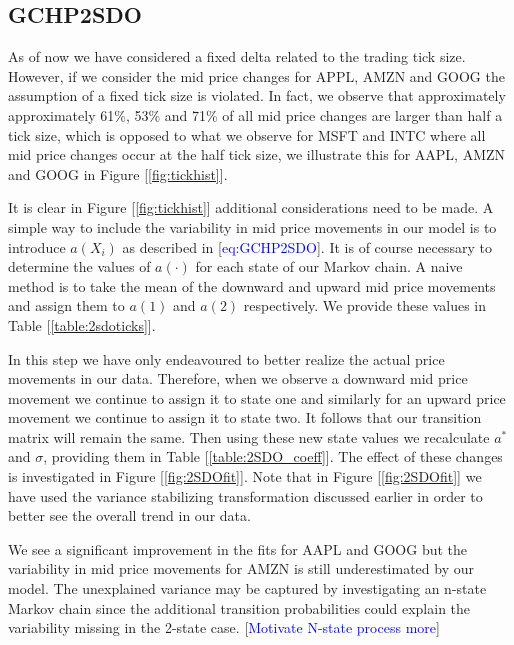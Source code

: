 \documentclass{article}
\begin{document}
\subsection*{GCHP2SDO}

As of now we have considered a fixed delta related to the trading tick size. However, if we consider the mid price changes for APPL, AMZN and GOOG the assumption of a fixed tick size is violated. In fact, we observe that approximately approximately 61\%, 53\% and 71\% of all mid price changes are larger than half a tick size, which is opposed to what we observe for MSFT and INTC where all mid price changes occur at the half tick size, we illustrate this for AAPL, AMZN and GOOG in Figure [\ref{fig:tickhist}].

It is clear in Figure [\ref{fig:tickhist}] additional considerations need to be made. A simple way to include the variability in mid price movements in our model is to introduce $a(X_i)$ as described in [\textcolor{blue}{eq:GCHP2SDO}]. It is of course necessary to determine the values of $a( \cdot )$ for each state of our Markov chain. A naive method is to take the mean of the downward and upward mid price movements and assign them to $a(1)$ and $a(2)$ respectively. We provide these values in Table [\ref{table:2sdoticks}].



In this step we have only endeavoured to better realize the actual price movements in our data. Therefore, when we observe a downward mid price movement we continue to assign it to state one and similarly for an upward price movement we continue to assign it to state two. It follows that our transition matrix will remain the same. Then using these new state values we recalculate $a^*$ and $\sigma$, providing them in Table [\ref{table:2SDO_coeff}]. The effect of these changes is investigated in Figure [\ref{fig:2SDOfit}]. Note that in Figure [\ref{fig:2SDOfit}] we have used the variance stabilizing transformation discussed earlier in order to better see the overall trend in our data.



We see a significant improvement in the fits for AAPL and GOOG but the variability in mid price movements for AMZN is still underestimated by our model. The unexplained variance may be captured by investigating an n-state Markov chain since the additional transition probabilities could explain the variability missing in the 2-state case. [\textcolor{blue}{Motivate N-state process more}]
\end{document}
